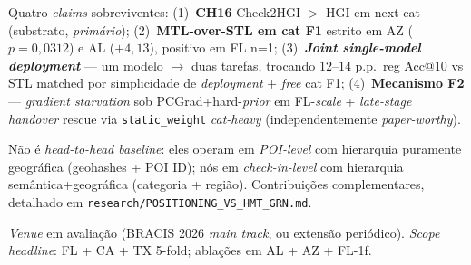 \documentclass[11pt,a4paper]{article}
\begin{document}
\begin{description}[leftmargin=1em,style=nextline,topsep=0pt]

\item[Contribuição do paper, pós-F21c.] Quatro \textit{claims} sobreviventes:
(1)~\textbf{CH16} Check2HGI $>$ HGI em next-cat (substrato, \emph{primário});
(2)~\textbf{MTL-over-STL em cat F1} estrito em AZ ($p=0{,}0312$) e AL ($+4{,}13$), positivo em FL n=1;
(3)~\textbf{\textit{Joint single-model deployment}} --- um modelo $\to$ duas tarefas, trocando $12$--$14$ p.p.\ reg Acc@10 vs STL matched por simplicidade de \textit{deployment} $+$ \textit{free} cat F1;
(4)~\textbf{Mecanismo F2} --- \textit{gradient starvation} sob PCGrad+hard-\textit{prior} em FL-\textit{scale} + \textit{late-stage handover} rescue via \texttt{static\_weight} \textit{cat-heavy} (independentemente \textit{paper-worthy}).

\item[Comparação com HMT-GRN (SIGIR 2022).] Não é \textit{head-to-head baseline}: eles operam em \textit{POI-level} com hierarquia puramente geográfica (geohashes + POI ID); nós em \textit{check-in-level} com hierarquia semântica+geográfica (categoria + região). Contribuições complementares, detalhado em \texttt{research/POSITIONING\_VS\_HMT\_GRN.md}.

\item[Alvo do paper.] \textit{Venue} em avaliação (BRACIS 2026 \textit{main track}, ou extensão periódico). \textit{Scope} \textit{headline}: FL + CA + TX 5-fold; ablações em AL + AZ + FL-1f.

\end{description}
\end{document}
